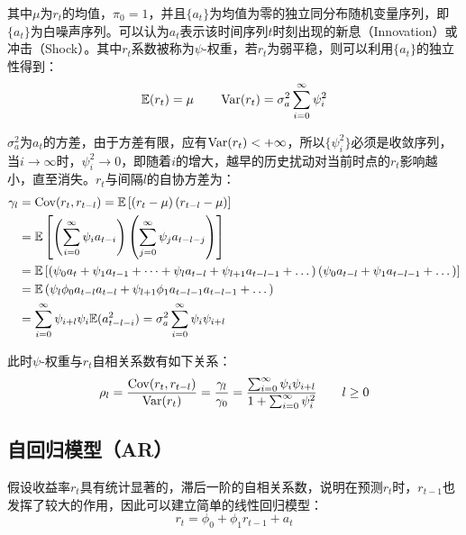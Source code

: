 \documentclass[11pt]{article}
\begin{document}
其中$\mu$为$r_t$的均值，$\pi_0=1$，并且$\{a_t\}$为均值为零的独立同分布随机变量序列，即$\{a_t\}$为白噪声序列。可以认为$a_t$表示该时间序列$t$时刻出现的新息（Innovation）或冲击（Shock）。其中$r_t$系数被称为$\psi$-权重，若$r_t$为弱平稳，则可以利用$\{a_t\}$的独立性得到：
\begin{equation*}
    \mathbb{E}(r_t) = \mu \qquad \operatorname{Var}(r_t) = \sigma_{a}^{2}\sum_{i=0}^{\infty} \psi_{i}^{2}
\end{equation*}

$\sigma_{a}^{2}$为$a_t$的方差，由于方差有限，应有$\operatorname{Var}(r_t)<+\infty$，所以$\{\psi_{i}^{2}\}$必须是收敛序列，当$i\rightarrow\infty$时，$\psi_{i}^{2}\rightarrow 0$，即随着$i$的增大，越早的历史扰动对当前时点的$r_t$影响越小，直至消失。$r_t$与间隔$l$的自协方差为：
\begin{align*}
    \gamma_l &= \operatorname{Cov}(r_t,r_{t-l})
    = \mathbb{E}\left[\left(r_t - \mu \right) \left(r_{t-l} - \mu \right) \right] \\
    &= \mathbb{E}\left[\left( \sum_{i=0}^{\infty} \psi_i a_{t-i} \right) \left( \sum_{j=0}^{\infty} \psi_j a_{t-l-j} \right) \right] \\
    &= \mathbb{E} \left[ \left( \psi_0 a_{t} + \psi_1 a_{t-1}  + \dots + \psi_l a_{t-l} + \psi_{l+1} a_{t-l-1}  + \dots \right) \left( \psi_0 a_{t-l} + \psi_1 a_{t-l-1} + \dots \right) \right] \\
    &= \mathbb{E} \left( \psi_l \phi_0 a_{t-l} a_{t-l} + \psi_{l+1} \phi_1 a_{t-l-1} a_{t-l-1}  + \dots \right)\\
    &= \sum_{i=0}^{\infty} \psi_{i+l} \psi_{i} \mathbb{E}(a_{t-l-i}^{2}) 
    = \sigma_{a}^{2} \sum_{i=0}^{\infty} \psi_i \psi_{i+l} 
\end{align*}

此时$\psi$-权重与$r_t$自相关系数有如下关系：
\begin{equation*}
    \rho_l = \frac{\operatorname{Cov}(r_t,r_{t-l})}{\operatorname{Var}(r_t)}
    = \frac{\gamma_l}{\gamma_0}
    = \frac{\sum_{i=0}^{\infty} \psi_i \psi_{i+l}}{1+ \sum_{i=0}^{\infty} \psi_i^2} \qquad l \geq 0
\end{equation*}

\subsection{自回归模型（AR）}

假设收益率$r_t$具有统计显著的，滞后一阶的自相关系数，说明在预测$r_t$时，$r_{t-1}$也发挥了较大的作用，因此可以建立简单的线性回归模型：
\begin{equation*}
    r_t = \phi_0 + \phi_1 r_{t-1} + a_t
\end{equation*}
\end{document}
